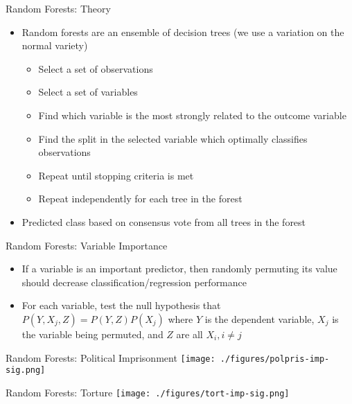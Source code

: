 \documentclass{beamer}
\begin{document}
\begin{frame}{Random Forests: Theory}
  \begin{itemize}
  \item Random forests are an ensemble of decision trees (we use a variation on the normal variety)
    \begin{itemize}
    \item Select a set of observations
    \item Select a set of variables
    \item Find which variable is the most strongly related to the outcome variable
    \item Find the split in the selected variable which optimally classifies observations
    \item Repeat until stopping criteria is met
    \item Repeat independently for each tree in the forest
    \end{itemize}
  \item Predicted class based on consensus vote from all trees in the forest
  \end{itemize}
\end{frame}

\begin{frame}{Random Forests: Variable Importance}
  \begin{itemize}
  \item If a variable is an important predictor, then randomly permuting its value should decrease classification/regression performance
  \item For each variable, test the null hypothesis that $P(Y, X_j, Z) = P(Y, Z)P(X_j)$ where $Y$ is the dependent variable, $X_j$ is the variable being permuted, and $Z$ are all $X_i, i \neq j$
  \end{itemize}
\end{frame}

\begin{frame}{Random Forests: Political Imprisonment}
  \centering
  \texttt{[image: ./figures/polpris-imp-sig.png]}
\end{frame}

\begin{frame}{Random Forests: Torture}
  \centering
  \texttt{[image: ./figures/tort-imp-sig.png]}
\end{frame}
\end{document}
